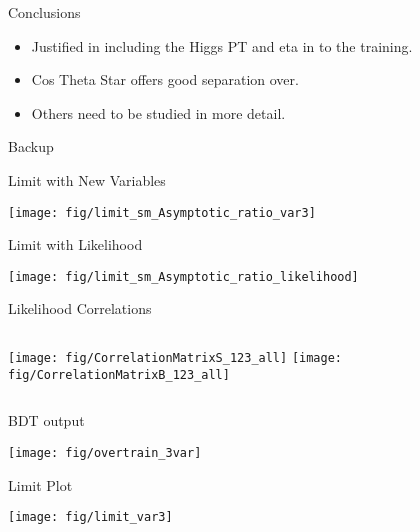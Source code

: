 \documentclass[t, 8pt]{beamer}
\begin{document}
\begin{frame}{Conclusions}

  \begin{itemize}  
  \item Justified in including the Higgs PT and eta in to the training.
  \item Cos Theta Star offers good separation over.
  \item Others need to be studied in more detail.
  \end{itemize}
\end{frame}

\begin{frame}{Backup} 


\end{frame}


\begin{frame}{Limit with New Variables} 
\begin{center}
    \texttt{[image: fig/limit\_sm\_Asymptotic\_ratio\_var3]}
\end{center}
\end{frame}

\begin{frame}{Limit with Likelihood} 
\begin{center}
    \texttt{[image: fig/limit\_sm\_Asymptotic\_ratio\_likelihood]}
\end{center}
\end{frame}

\begin{frame}{Likelihood Correlations}
  \begin{columns}[c]
    \texttt{[image: fig/CorrelationMatrixS\_123\_all]}
    \texttt{[image: fig/CorrelationMatrixB\_123\_all]}
  \end{columns}
\end{frame}


\begin{frame}{BDT output}
\begin{center}
    \texttt{[image: fig/overtrain\_3var]}
\end{center}
\end{frame}

\begin{frame}{Limit Plot}
\begin{center}
    \texttt{[image: fig/limit\_var3]}
\end{center}
\end{frame}
\end{document}
